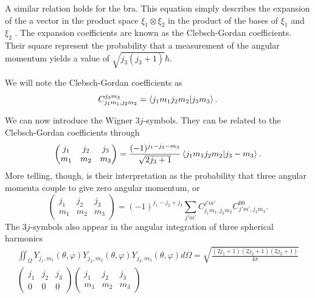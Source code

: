 A similar relation holds for the bra. This equation simply 
describes the expansion of the a vector in the product space
$\xi_1\otimes\xi_2$ in the product of the bases of $\xi_1$ 
and $\xi_2$ \cite{COH1973b}. The expansion coefficients are known as the 
Clebsch-Gordan coefficients. Their square represent 
the probability that a measurement of the angular momentum 
yields a value of $\sqrt{j_3(j_3+1)}\hbar$.

We will note the Clebsch-Gordan coefficients
as
  \begin{equation}
    C^{j_3m_3}_{j_1m_1,j_2m_2} = \braket{j_1m_1j_2m_2|j_3m_3}.
  \end{equation}

We can now introduce the Wigner $3j$-symbols. They can be related
to the Clebsch-Gordan coefficients through
  \begin{equation}
   \begin{pmatrix} j_1 & j_2 & j_3 \\
		   m_1 & m_2 & m_3
   \end{pmatrix}
    = \frac{(-1)^{j_1-j_2-m_3}}{\sqrt{2j_3+1}}\braket{j_1m_1j_2m_2|j_3-m_3}.
  \end{equation}
More telling, though, is their interpretation as the probability
that three angular momenta couple to give zero angular momentum, or
  \begin{equation}
   \begin{pmatrix} j_1 & j_2 & j_3 \\
		   m_1 & m_2 & m_3
   \end{pmatrix}
    = (-1)^{j_1-j_2+j_3}\sum_{j'm'} C^{j'm'}_{j_1m_1,j_2m_2}C^{00}_{j'm',j_3m_3}.
  \end{equation}
The $3j$-symbols also appear in the angular integration of three spherical
harmonics 
  \begin{multline}
    \mathop{\iint}_\Omega Y_{j_1,m_1}(\theta,\varphi)Y_{j_2,m_2}(\theta,\varphi)Y_{j_3,m_3}(\theta,\varphi)d\Omega
      =
    \sqrt{\frac{(2j_1+1)(2j_2+1)(2j_3+1)}{4\pi}}\\\begin{pmatrix} j_1 & j_2 & j_3 \\ 0 & 0 & 0 \end{pmatrix}\begin{pmatrix} j_1 & j_2 & j_3 \\ m_1 & m_2 & m_3\end{pmatrix}
  \end{multline}

